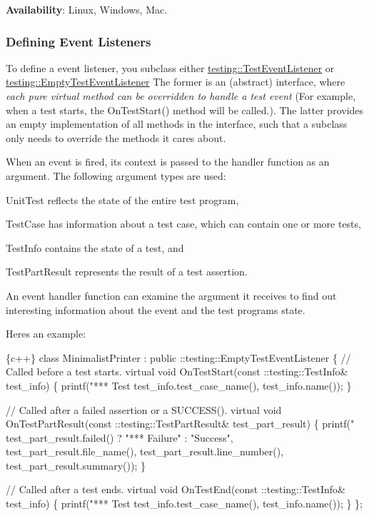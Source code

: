 {\bfseries Availability}\+: Linux, Windows, Mac.

\subsubsection*{Defining Event Listeners}

To define a event listener, you subclass either \hyperlink{classtesting_1_1TestEventListener}{testing\+::\+Test\+Event\+Listener} or \hyperlink{classtesting_1_1EmptyTestEventListener}{testing\+::\+Empty\+Test\+Event\+Listener} The former is an (abstract) interface, where {\itshape each pure virtual method can be overridden to handle a test event} (For example, when a test starts, the {\ttfamily On\+Test\+Start()} method will be called.). The latter provides an empty implementation of all methods in the interface, such that a subclass only needs to override the methods it cares about.

When an event is fired, its context is passed to the handler function as an argument. The following argument types are used\+:


\begin{DoxyItemize}
\item Unit\+Test reflects the state of the entire test program,
\item Test\+Case has information about a test case, which can contain one or more tests,
\item Test\+Info contains the state of a test, and
\item Test\+Part\+Result represents the result of a test assertion.
\end{DoxyItemize}

An event handler function can examine the argument it receives to find out interesting information about the event and the test program\textquotesingle{}s state.

Here\textquotesingle{}s an example\+:


\begin{DoxyCode}
\{c++\}
  class MinimalistPrinter : public ::testing::EmptyTestEventListener \{
    // Called before a test starts.
    virtual void OnTestStart(const ::testing::TestInfo& test\_info) \{
      printf("*** Test %
             test\_info.test\_case\_name(), test\_info.name());
    \}

    // Called after a failed assertion or a SUCCESS().
    virtual void OnTestPartResult(const ::testing::TestPartResult& test\_part\_result) \{
      printf("%
             test\_part\_result.failed() ? "*** Failure" : "Success",
             test\_part\_result.file\_name(),
             test\_part\_result.line\_number(),
             test\_part\_result.summary());
    \}

    // Called after a test ends.
    virtual void OnTestEnd(const ::testing::TestInfo& test\_info) \{
      printf("*** Test %
             test\_info.test\_case\_name(), test\_info.name());
    \}
  \};
\end{DoxyCode}



